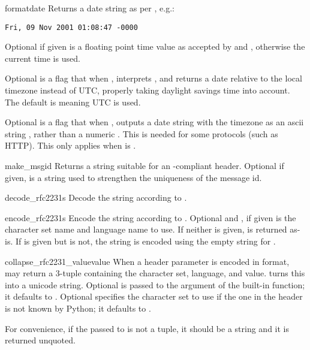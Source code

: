 \begin{funcdesc}{formatdate}{}
Returns a date string as per , e.g.:

\begin{verbatim}
Fri, 09 Nov 2001 01:08:47 -0000
\end{verbatim}

Optional  if given is a floating point time value as
accepted by  and ,
otherwise the current time is used.

Optional  is a flag that when , interprets
, and returns a date relative to the local timezone
instead of UTC, properly taking daylight savings time into account.
The default is  meaning UTC is used.

Optional  is a flag that when , outputs a 
date string with the timezone as an ascii string , rather
than a numeric . This is needed for some protocols (such
as HTTP). This only applies when  is .
\end{funcdesc}

\begin{funcdesc}{make_msgid}{}
Returns a string suitable for an -compliant
 header.  Optional  if given, is
a string used to strengthen the uniqueness of the message id.
\end{funcdesc}

\begin{funcdesc}{decode_rfc2231}{s}
Decode the string  according to .
\end{funcdesc}

\begin{funcdesc}{encode_rfc2231}{s}
Encode the string  according to .  Optional
 and , if given is the character set name
and language name to use.  If neither is given,  is returned
as-is.  If  is given but  is not, the
string is encoded using the empty string for .
\end{funcdesc}

\begin{funcdesc}{collapse_rfc2231_value}{value}
When a header parameter is encoded in  format,
 may return a 3-tuple containing the character
set, language, and value.   turns this into
a unicode string.  Optional  is passed to the 
argument of the built-in  function; it defaults to
.  Optional  specifies the character set
to use if the one in the  header is not known by Python; it defaults
to .

For convenience, if the  passed to
 is not a tuple, it should be a string and
it is returned unquoted.
\end{funcdesc}


